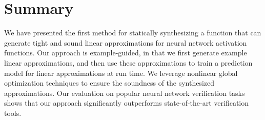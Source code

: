 

\section{Summary}
\label{offlinesyn:sec:conclusion}

We have presented the first method for statically
synthesizing a function that can generate tight and sound linear
approximations for neural network activation functions. Our approach
is example-guided, in that we first generate example linear
approximations, and then use these approximations to train a
prediction model for linear approximations at run time. We leverage
nonlinear global optimization techniques to ensure the soundness of
the synthesized approximations. Our evaluation on popular neural
network verification tasks shows that our approach significantly
outperforms state-of-the-art verification tools.